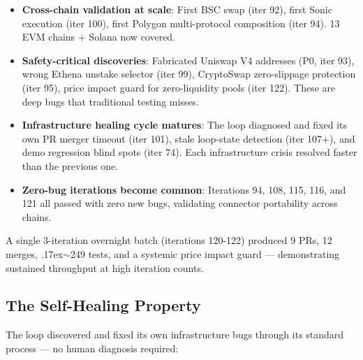 \documentclass[11pt,a4paper]{article}
\newcommand{\roughly}{{\textraisebox{.17ex}{$\scriptstyle\sim$}}}
\newcommand{\textraisebox}[2]{\leavevmode\raise#1\hbox{#2}}
\providecommand{\tightlist}{%
  \setlength{\itemsep}{0pt}\setlength{\parskip}{0pt}}
\begin{document}
\begin{itemize}
\tightlist
\item
  \textbf{Cross-chain validation at scale}: First BSC swap (iter 92), first Sonic execution (iter 100), first Polygon multi-protocol composition (iter 94). 13 EVM chains + Solana now covered.
\item
  \textbf{Safety-critical discoveries}: Fabricated Uniswap V4 addresses (P0, iter 93), wrong Ethena unstake selector (iter 99), CryptoSwap zero-slippage protection (iter 95), price impact guard for zero-liquidity pools (iter 122). These are deep bugs that traditional testing misses.
\item
  \textbf{Infrastructure healing cycle matures}: The loop diagnosed and fixed its own PR merger timeout (iter 101), stale loop-state detection (iter 107+), and demo regression blind spots (iter 74). Each infrastructure crisis resolved faster than the previous one.
\item
  \textbf{Zero-bug iterations become common}: Iterations 94, 108, 115, 116, and 121 all passed with zero new bugs, validating connector portability across chains.
\end{itemize}

A single 3-iteration overnight batch (iterations 120-122) produced 9 PRs, 12 merges, \roughly249 tests, and a systemic price impact guard --- demonstrating sustained throughput at high iteration counts.

\subsection{The Self-Healing Property}\label{sec:self-healing-property}

The loop discovered and fixed its own infrastructure bugs through its standard process --- no human diagnosis required:
\end{document}
